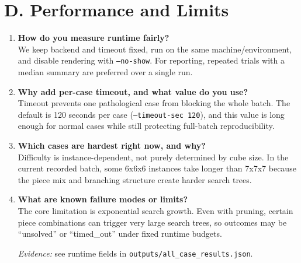 \documentclass[11pt]{article}
\begin{document}
\section*{D. Performance and Limits}
\begin{enumerate}[leftmargin=*,label=\textbf{Q\arabic*.},start=14]
\item \textbf{How do you measure runtime fairly?}\\
We keep backend and timeout fixed, run on the same machine/environment, and disable rendering with \texttt{--no-show}. For reporting, repeated trials with a median summary are preferred over a single run.

\item \textbf{Why add per-case timeout, and what value do you use?}\\
Timeout prevents one pathological case from blocking the whole batch. The default is 120 seconds per case (\texttt{--timeout-sec 120}), and this value is long enough for normal cases while still protecting full-batch reproducibility.

\item \textbf{Which cases are hardest right now, and why?}\\
Difficulty is instance-dependent, not purely determined by cube size. In the current recorded batch, some 6x6x6 instances take longer than 7x7x7 because the piece mix and branching structure create harder search trees.

\item \textbf{What are known failure modes or limits?}\\
The core limitation is exponential search growth. Even with pruning, certain piece combinations can trigger very large search trees, so outcomes may be ``unsolved'' or ``timed\_out'' under fixed runtime budgets.

\textit{Evidence:} see runtime fields in \texttt{outputs/all\_case\_results.json}.
\end{enumerate}
\end{document}
